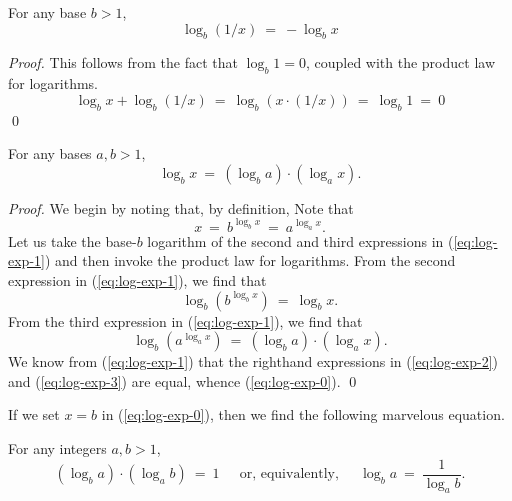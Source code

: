\begin{prop}
For any base $b >1$,
\[ \log_b (1/x) \ = \ - \log_b x \]
\end{prop}

\begin{proof}
This follows from the fact that $\log_b 1 =0$, coupled with the
product law for logarithms.
\[ \log_b x + \log_b (1/x) \ = \ \log_b (x \cdot (1/x))
\  = \ \log_b 1 \ = \ 0 
\]
\qed
\end{proof}

\begin{prop}
For any bases $a, b >1$,
\begin{equation}
\label{eq:log-exp-0}
\log_b x \ = \ \left(\log_b a \right) \cdot \left( \log_a x \right).
\end{equation}
\end{prop}

\begin{proof}
We begin by noting that, by definition,
Note that
\begin{equation}
\label{eq:log-exp-1}
 x \ = \ b^{\log_b x} \ = \ a^{\log_a x} .
\end{equation}
Let us take the base-$b$ logarithm of the second and third expressions
in (\ref{eq:log-exp-1}) and then invoke the product law for logarithms.
From the second expression in (\ref{eq:log-exp-1}), we find that
\begin{equation}
\label{eq:log-exp-2}
 \log_b \left(b^{\log_b x} \right) \ = \ \log_b x .
\end{equation}
From the third expression in (\ref{eq:log-exp-1}), we find that
\begin{equation}
\label{eq:log-exp-3}
 \log_b \left( a^{\log_a x} \right) \ = \
\left(\log_b a \right) \cdot \left( \log_a x \right).
\end{equation}
We know from (\ref{eq:log-exp-1}) that the righthand expressions in
(\ref{eq:log-exp-2}) and (\ref{eq:log-exp-3}) are equal, whence
(\ref{eq:log-exp-0}).   \qed
\end{proof}

If we set $x = b$ in (\ref{eq:log-exp-0}), then we find the following
marvelous equation.

\begin{prop}
For any integers $a, b >1$,
\begin{equation}
\left(\log_b a \right) \cdot \left( \log_a b \right) \ = \ 1 \ \ \ \ \
\mbox{ or, equivalently, } \ \ \ \ \
\log_b a \ = \ \frac{1}{\log_a b} .
\end{equation}
\end{prop}


